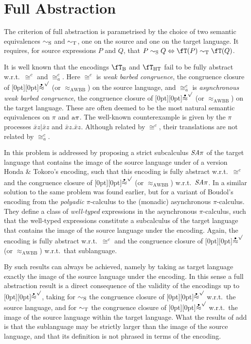\documentclass[runningheads]{llncs}
\newcommand{\fTHT}{\fT_{\textrm{HT}}}       %
\newcommand{\plat}[1]{\raisebox{0pt}[0pt][0pt]{#1}}     %
\newcommand{\wbb}{\stackrel{\raisebox{-1pt}[0pt][0pt]{$\scriptscriptstyle \bullet$}}{\approx}}
\newcommand{\wssbb}{\wbb^\surd}
\newcommand{\wbbisim}{\ensuremath{\mathrel{\approx_{\mathrm{AWBB}}}}}
\newcommand{\pims}{\pi}
\newcommand{\pima}{{\rm a\pi}}
\begin{document}
\section{Full Abstraction}\label{sec:full abstraction}

The criterion of full abstraction is parametrised by the choice of two semantic equivalences $\sim_{\rm S}$ and $\sim_{\rm T}$,
one on the source and one on the target language. It requires, for source expressions $P$ and $Q$, that
$P \sim_{\rm S} Q \Leftrightarrow \fT(P) \sim_{\rm T} \fT(Q)$.

It is well known that the encodings $\fT_{\rm B}$ and $\fTHT$ fail to be fully abstract w.r.t.\ $\cong^c$ and $\cong^c_a$.
Here $\cong^c$ is \emph{weak barbed congruence}, the congruence closure of \plat{$\wssbb$} (or $\wbbisim$) on the source language, and
$\cong^c_a$ is \emph{asynchronous weak barbed congruence}, the congruence closure of \plat{$\wssbb$}
(or $\wbbisim$) on the target language.
These are often deemed to be the most natural semantic equivalences on $\pims$ and $\pima$.
The well-known counterexample is given by the $\pims$ processes $\bar x z |  \bar x z$ and $\bar xz.\bar x z$.
Although related by $\cong^c$, their translations are not related by $\cong^c_a$.

In \cite{DYZ18} this problem is addressed by proposing a strict subcalculus $\it SA\pi$ of the 
target language that contains the image of the source language under of a version Honda
\& Tokoro's encoding, such that this encoding is fully abstract w.r.t.\ $\cong^c$ and
the congruence closure of \plat{$\wssbb$} (or $\wbbisim$) w.r.t.\ $\it SA\pi$.
In \cite{QW00} a similar solution to the same problem was found earlier, but for a variant of
Boudol's encoding from the \emph{polyadic} $\pi$-calculus to the (monadic) asynchronous
$\pi$-calculus.  They define a class of \emph{well-typed} expressions in the asynchronous
$\pi$-calculus, such that the well-typed expressions constitute a subcalculus of the target language
that contains the image of the source language under the encoding. Again, the encoding is fully
abstract w.r.t.\ $\cong^c$ and the congruence closure of \plat{$\wssbb\!\!$} (or $\wbbisim$) w.r.t.\ that sublanguage.

By \cite[Theorem 4]{vG18b} such results can always be achieved, namely by taking
as target language exactly the image of the source language under the encoding.
In this sense a full abstraction result is a direct consequence of the validity of the encodings up
to \plat{$\wssbb$}, taking for $\sim_{\rm S}$ the congruence closure of \plat{$\wssbb$} w.r.t.\ the source language,
and for $\sim_{\rm T}$ the congruence closure of \plat{$\wssbb$} w.r.t.\ the image of the source language
within the target language.
What the results of \cite{QW00,DYZ18} add is that the sublanguage may be strictly larger than the
image of the source language, and that its definition is not phrased in terms of the encoding.
\end{document}
